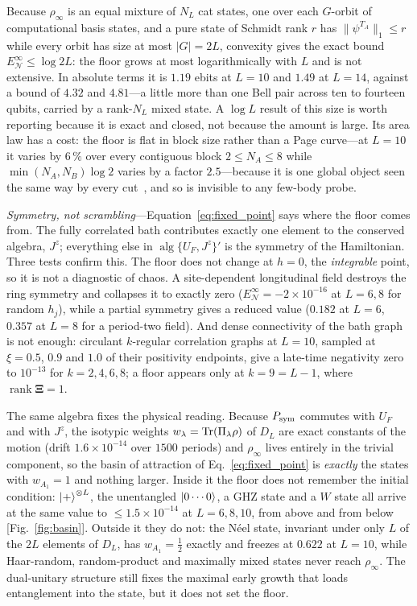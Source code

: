 \documentclass[aps,prl,reprint,amsmath,amssymb,floatfix]{revtex4-2}
\newcommand{\ENinf}{E_{\mathcal N}^{\infty}}
\newcommand{\Psym}{P_{\rm sym}}
\begin{document}
Because $\rho_\infty$ is an equal mixture of $N_L$ cat states, one over each
$G$-orbit of computational basis states, and a pure state of Schmidt rank $r$
has $\lVert\psi^{T_A}\rVert_1\le r$ while every orbit has size at most
$\lvert G\rvert=2L$, convexity gives the exact bound $\ENinf\le\log2L$: the
floor grows at most logarithmically with $L$ and is not extensive. In absolute
terms it is $1.19$ ebits at
$L=10$ and $1.49$ at $L=14$, against a bound of $4.32$ and $4.81$---a little
more than one Bell pair across ten to fourteen qubits, carried by a rank-$N_L$
mixed state. A $\log L$ result of this size is worth reporting because it is exact and
closed, not because the amount is large. Its area law has a cost: the floor is
flat in block size rather than a Page curve---at $L=10$ it varies by $6\,\%$
over every contiguous block $2\le N_A\le8$ while $\min(N_A,N_B)\log2$ varies by
a factor $2.5$---because it is one global object seen the same way by every
cut~\cite{SM}, and so is invisible to any few-body probe.

{\it Symmetry, not scrambling}---Equation~\eqref{eq:fixed_point} says where the
floor comes from. The fully correlated bath contributes exactly one element to
the conserved algebra, $J^z$; everything else in
$\operatorname{alg}\{U_F,J^z\}'$ is the symmetry of the Hamiltonian. Three
tests confirm this. The floor does not change at $h=0$, the \emph{integrable}
point, so it is not a diagnostic of chaos. A site-dependent longitudinal field
destroys the ring symmetry and collapses it to exactly zero
($\ENinf=-2\times10^{-16}$ at $L=6,8$ for random $h_j$), while a partial
symmetry gives a reduced value ($0.182$ at $L=6$, $0.357$ at $L=8$ for a
period-two field). And dense connectivity of the bath graph is not enough:
circulant $k$-regular correlation graphs at $L=10$, sampled at $\xi=0.5$, $0.9$
and $1.0$ of their positivity endpoints, give a late-time negativity zero to
$10^{-13}$ for $k=2,4,6,8$; a floor appears only at $k=9=L-1$, where
$\operatorname{rank}\bm\Xi=1$.

The same algebra fixes the physical reading. Because $\Psym$ commutes with
$U_F$ and with $J^z$, the isotypic weights $w_\lambda=\Tr(\Pi_\lambda\rho)$ of
$D_L$ are exact constants of the motion (drift $1.6\times10^{-14}$ over $1500$
periods) and $\rho_\infty$ lives entirely in the trivial component, so the
basin of attraction of Eq.~\eqref{eq:fixed_point} is \emph{exactly} the states
with $w_{A_1}=1$ and nothing larger. Inside it the floor does not remember the
initial condition: $\ket{+}^{\otimes L}$, the unentangled $\ket{0\cdots0}$, a
GHZ state and a $W$ state all arrive at the same value to
$\le1.5\times10^{-14}$ at $L=6,8,10$, from above and from below
[Fig.~\ref{fig:basin}]. Outside it they do not: the N\'eel state, invariant
under only $L$ of the $2L$ elements of $D_L$, has $w_{A_1}=\tfrac12$ exactly
and freezes at $0.622$ at $L=10$, while Haar-random, random-product and
maximally mixed states never reach $\rho_\infty$. The dual-unitary structure
still fixes the maximal early growth that loads entanglement into the state,
but it does not set the floor.
\end{document}
